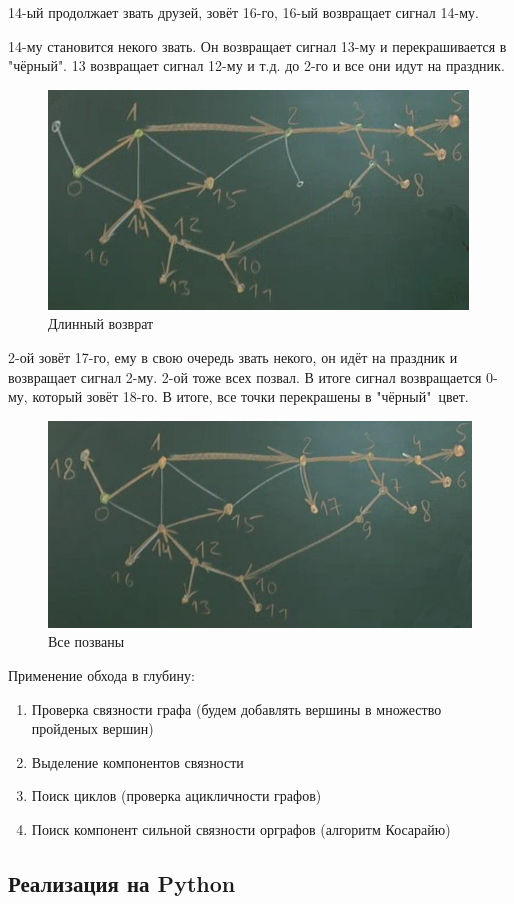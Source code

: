 14-ый продолжает звать друзей, зовёт 16-го, 16-ый возвращает сигнал 14-му.

14-му становится некого звать. Он возвращает сигнал 13-му и перекрашивается в "чёрный". 13 возвращает сигнал 12-му и т.д. до 2-го и все они идут на праздник.

\begin{figure}[h!]
	\centering
	\includegraphics[width=0.5\linewidth]{lection_18/alg8}
	\caption{Длинный возврат}
\end{figure}

2-ой зовёт 17-го, ему в свою очередь звать некого, он идёт на праздник и возвращает сигнал 2-му. 2-ой тоже всех позвал. В итоге сигнал возвращается 0-му, который зовёт 18-го. В итоге, все точки перекрашены в "чёрный"\ цвет. 

\begin{figure}[h!]
	\centering
	\includegraphics[width=0.5\linewidth]{lection_18/alg9}
	\caption{Все позваны}
\end{figure}

Применение обхода в глубину:
\begin{enumerate}
	\item Проверка связности графа (будем добавлять вершины в множество пройденых вершин)
	\item Выделение компонентов связности
	\item Поиск циклов (проверка ацикличности графов)
	\item Поиск компонент сильной связности орграфов (алгоритм Косарайю)
\end{enumerate}

\subsection{Реализация на Python}

